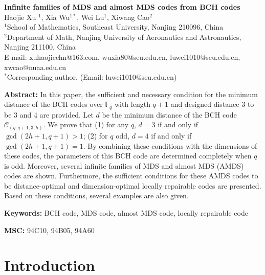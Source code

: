 \documentclass[10pt]{article}%
\begin{document}
	
	\begin{center}
		
		{\large  \bf Infinite families of MDS and almost MDS codes from BCH codes\footnotemark[2]}
		\vskip 0.8cm
		{\small Haojie Xu $^1$, Xia Wu$^{1*}$, Wei Lu$^1$, Xiwang Cao$^2$}\\
		
		{\small $^1$School of Mathematics, Southeast University, Nanjing 210096, China}\\
		{\small $^2$Department of Math, Nanjing University of Aeronautics and Astronautics, Nanjing 211100, China}\\
		{\small E-mail:
			xuhaojiechn@163.com, wuxia80@seu.edu.cn, luwei1010@seu.edu.cn, xwcao@nuaa.edu.cn}\\
		{\small $^*$Corresponding author. (Email: luwei1010@seu.edu.cn)}
		\vskip 0.8cm
	\end{center}
	
	
	{\bf Abstract:}
	In this paper, the sufficient and necessary condition for the minimum distance of the BCH codes over $\mathbb{F}_q$ with length $q+1$ and designed distance 3 to be 3 and 4 are provided. Let $d$ be the minimum distance of the BCH code $\mathcal{C}_{(q,q+1,3,h)}$. We prove that (1) for any $q$, $d=3$ if and only if $\gcd(2h+1,q+1)>1$; (2) for $q$ odd, $d=4$ if and only if $\gcd(2h+1,q+1)=1$. By combining these conditions with the dimensions of these codes, the parameters of this BCH code are determined completely when $q$ is odd. Moreover, several infinite families of MDS and almost MDS (AMDS) codes are shown. Furthermore, the sufficient conditions for these AMDS codes to be distance-optimal and dimension-optimal locally repairable codes are presented. Based on these conditions, several examples are also given.
	
	
	
	{\bf Keywords:} BCH code, MDS code, almost MDS code, locally repairable code
	
	{\bf MSC:} 94C10, 94B05, 94A60
	
	
	\section{Introduction}\label{sec1}
	
\end{document}
